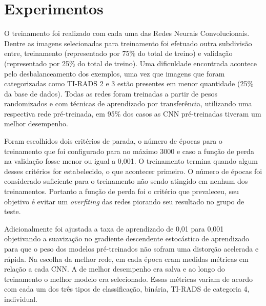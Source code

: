 \documentclass[12pt]{article}
\begin{document}
\section{Experimentos}
O treinamento foi realizado com cada uma das Redes Neurais Convolucionais. Dentre as imagens selecionadas para treinamento foi efetuado outra subdivisão entre, treinamento (representado por 75\% do total de treino) e validação (representado por 25\% do total de treino). Uma dificuldade encontrada acontece pelo desbalanceamento dos exemplos, uma vez que imagens que foram categorizadas como TI-RADS 2 e 3 estão presentes em menor quantidade (25\% da base de dados). Todas as redes foram treinadas a partir de pesos randomizados e com técnicas de aprendizado por transferência, utilizando uma respectiva rede pré-treinada, em 95\% dos casos as CNN pré-treinadas tiveram um melhor desempenho.

Foram escolhidos dois critérios de parada, o número de épocas para o treinamento que foi configurado para no máximo 3000 e caso a função de perda na validação fosse menor ou igual a 0,001. O treinamento termina quando algum desses critérios for estabelecido, o que acontecer primeiro. O número de épocas foi considerado suficiente para o treinamento não sendo atingido em nenhum dos treinamentos. Portanto a função de perda foi o critério que prevaleceu, seu objetivo é evitar um \textit{overfiting} das redes piorando seu resultado no grupo de teste.

Adicionalmente foi ajustada a taxa de aprendizado de 0,01 para 0,001 objetivando a suavização no gradiente descendente estocástico de aprendizado para que o peso dos modelos pré-treinados não sofram uma distorção acelerada e rápida. Na escolha da melhor rede, em cada época eram medidas métricas em relação a cada CNN. A de melhor desempenho era salva e ao longo do treinamento o melhor modelo era selecionado. Essas métricas variam de acordo com cada um dos três tipos de classificação, binária, TI-RADS de categoria 4, individual.
\end{document}

